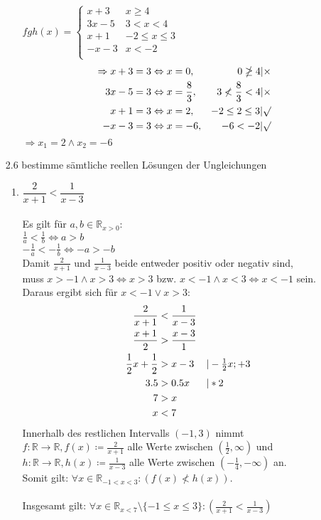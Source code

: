 \documentclass[12pt,letterpaper]{article}
\newcommand{\alignleft}[1]{\tag*{\llap{\makebox[\linewidth][l]{$#1$}}}}
\newcommand{\LLeftrightarrow}{ \alignleft{\Leftrightarrow}}
\newcommand{\eqinfo}[1]{&\makebox[2cm][l]{$\vert #1$}}
\newcommand{\Eqn}[3]{#1 &#2 #3}
\newcommand{\geqnf}[3]{\Eqn{#1}{#2}{#3}\\}
\newcommand{\geqn}[3]{\LLeftrightarrow\Eqn{#1}{#2}{#3}\\}
\newcommand{\geqni}[4]{\LLeftrightarrow\Eqn{#1}{#2}{#3}\eqinfo{#4}\\}
\begin{document}
\begin{enumerate}
\begin{enumerate}
$fgh(x) = \begin{cases}
x+3 &x\geq 4\\
3x-5 &3<x<4\\
x+1 &-2\leq x\leq 3\\
-x-3 &x<-2\\
\end{cases}$\\
\begin{align*}
\Rightarrow x+3&=3 \Leftrightarrow x=0, &0\ngeq 4|\times\\
3x-5&=3 \Leftrightarrow x=\frac{8}{3}, &3\nless\frac{8}{3}< 4|\times\\
x+1&=3 \Leftrightarrow x=2, &-2\leq 2\leq 3|\surd\\
-x-3&=3 \Leftrightarrow x=-6, &-6<-2|\surd\\
\end{align*}
$\Rightarrow x_1 = 2 \land x_2 = -6$
\end{enumerate}
\item [2.6] bestimme sämtliche reellen Lösungen der Ungleichungen
\begin{enumerate}
\item $\dfrac{2}{x+1}<\dfrac{1}{x-3}$\\\\
Es gilt für $a,b\in\mathbb{R}_{x > 0}$:\\
$\frac{1}{a}<\frac{1}{b}\Leftrightarrow a>b$\\
$-\frac{1}{a}<-\frac{1}{b}\Leftrightarrow -a>-b$\\
Damit $\frac{2}{x+1}$ und $\frac{1}{x-3}$ beide entweder positiv oder negativ sind,\\
muss $x>-1 \land x>3 \Leftrightarrow x>3$ bzw. $x<-1 \land x<3 \Leftrightarrow x<-1$ sein.\\
Daraus ergibt sich für $x<-1 \lor x>3$:
\begin{align*}
\geqnf{\frac{2}{x+1}}{<}{\frac{1}{x-3}}
\geqn{\frac{x+1}{2}}{>}{\frac{x-3}{1}}
\geqni{\frac{1}{2}x+\frac{1}{2}}{>}{x-3}{-\frac{1}{2}x; +3}
\geqni{3.5}{>}{0.5x}{*2}
\geqn{7}{>}{x}
\geqn{x}{<}{7}
\end{align*}
Innerhalb des restlichen Intervalls $(-1,3)$ nimmt $f:\mathbb{R}\to\mathbb{R}, f(x)\coloneqq\frac{2}{x+1}$ alle Werte zwischen $(\frac{1}{2},\infty)$ und $h:\mathbb{R}\to\mathbb{R}, h(x)\coloneqq\frac{1}{x-3}$ alle Werte zwischen $(-\frac{1}{4}, -\infty)$ an.\\
Somit gilt: $\forall x\in\mathbb{R}_{-1<x<3}:(f(x)\nless h(x))$.\\\\
Insgesamt gilt: $\forall x\in\mathbb{R}_{x<7}\setminus\{-1\leq x\leq3\}:(\frac{2}{x+1}<\frac{1}{x-3})$


\end{enumerate}
\end{enumerate}
\end{document}
